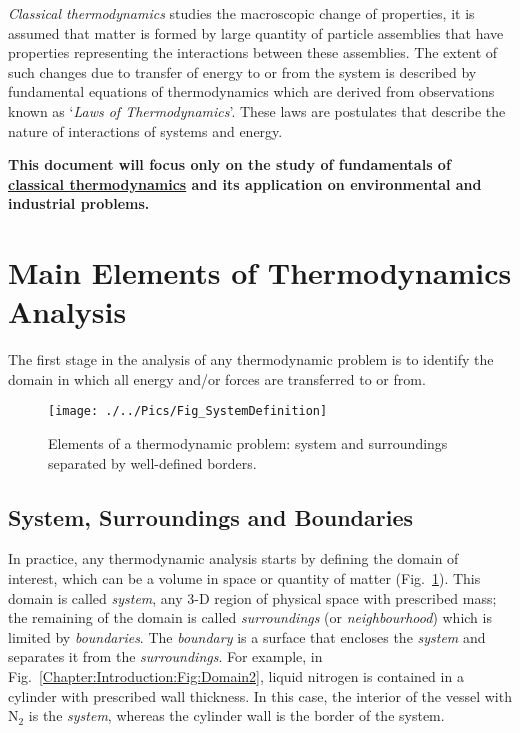    {\it Classical thermodynamics} studies the macroscopic change of properties, \ie it is assumed that matter is formed by large quantity of particle assemblies that have properties representing the interactions between these assemblies. The extent of such changes due to transfer of energy to or from the system is described by fundamental equations of thermodynamics which are derived from observations known as `{\it Laws of Thermodynamics}'. These laws are postulates that describe the nature of interactions of systems and energy.

   {\bf This document will focus only on the study of fundamentals of \underline{classical thermodynamics} and its application on environmental and industrial problems. }

   \section{Main Elements of Thermodynamics Analysis}\label{Chapter:Introduction:Section:ThermodAnalysis}

   The first stage in the analysis of any thermodynamic problem is to identify the domain in which all energy and/or forces are transferred to or from.
   
   \begin{figure}[h]
     \begin{center}
       \texttt{[image: ./../Pics/Fig\_SystemDefinition]}
       \caption{Elements of a thermodynamic problem: system and surroundings separated by well-defined borders.}\label{Chapter:Introduction:Fig:Domain}
     \end{center}
   \end{figure}
   
   
   \subsection{System, Surroundings and Boundaries}\label{Chapter:Introduction:Section:Introduction:SystemSurroundingsBoundaries}
   In practice, any thermodynamic analysis starts by defining the domain of interest, which can be a volume in space or quantity of matter (Fig.~\ref{Chapter:Introduction:Fig:Domain}). This domain is called {\it system}, \ie any 3-D region of physical space with prescribed mass; the remaining of the domain is called {\it surroundings} (or {\it neighbourhood}) which is limited by {\it boundaries}. The {\it boundary} is a surface that encloses the {\it system} and separates it from the {\it surroundings}. For example, in Fig.~\ref{Chapter:Introduction:Fig:Domain2}, liquid nitrogen is contained in a cylinder with prescribed wall thickness. In this case, the interior of the vessel with N$_{2}$ is the {\it system}, whereas the cylinder wall is the border of the system. 

